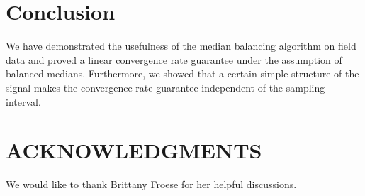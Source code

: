 \documentclass{segabs}
\begin{document}
\section{Conclusion}

We have demonstrated the usefulness of the median balancing algorithm on field data and proved a linear convergence rate guarantee under the assumption of balanced medians.  Furthermore, we showed that a certain simple structure of the signal makes the convergence rate guarantee independent of the sampling interval.

\section{ACKNOWLEDGMENTS}

We would like to thank Brittany Froese for her helpful discussions.


\onecolumn



\twocolumn


\end{document}
